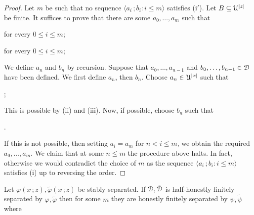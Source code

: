 \documentclass{amsproc}
\begin{document}
{\begin{lemma}
  
  
\end{lemma}

\begin{proof}
  Let $m$ be such that no sequence $\langle a_i\,;b_i : i\le m\rangle$ satisfies (i$'$).
  Let $B\subseteq{\EuScript U}^{|z|}$ be finite.
  It suffices to prove that there are some $a_0,\dots,a_m$ such that 
  
  \hfill for every $0\le i\le m$;
  
  \hfill for every $0\le i\le m$;


  We define $a_n$ and $b_n$ by recursion.
  Suppose that $a_0,\dots,a_{n-1}$ and $b_0,\dots,b_{n-1}\in{\EuScript D}$ have been defined.
  We first define $a_n$, then $b_n$. 
  Choose $a_n\in{\EuScript U}^{|x|}$ such that 
  
  ;
  


  This is possible by (ii) and (iii).
  Now, if possible, choose $b_n$ such that

  .

  If this is not possible, then setting $a_i=a_m$ for $n<i\le m$, we obtain the required $a_0,\dots,a_m$.
  We claim that at some $n\le m$ the procedure above halts.
  In fact, otherwise we would contradict the choice of $m$ as the sequence $\langle a_i\,;b_i : i\le m\rangle$ satisfies (i) up to reversing the order.
\end{proof}


\begin{lemma}\label{lem_sability2}
  Let $\varphi(x\,;z),\tilde\varphi(x\,;z)$ be stably separated.
  If ${\EuScript D},\tilde{\EuScript D}$ is half-honestly finitely separated by $\varphi,\tilde\varphi$ then for some $m$ they are honestly finitely separated by $\psi,\tilde\psi$ where 
  

\end{lemma}}
\end{document}
